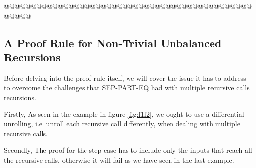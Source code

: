 @@@@@@@@@@@@@@@@@@@@@@@@@@@@@@@@@@@@@@@@@@@@@@@@@@@

\subsection{A Proof Rule for Non-Trivial Unbalanced Recursions}
\label{sec:adaptstep}
Before delving into the proof rule itself, we will cover the issue it has to address to overcome the challenges that SEP-PART-EQ had with multiple recursive calls recursions.

Firstly, As seen in the example in figure \ref{fig:f1f2}, we ought to use a differential unrolling, i.e. unroll each recursive call differently, when dealing with multiple recursive calls.

Secondly, The proof for the step case has to include only the inputs that reach all the recursive calls, otherwise it will fail as we have seen in the last example.

\iffalse
The solution that comes to mind is improving the assertion to limit $UFs\_count$ with the total number of $UF$ calls on both sides. We will define MRC-STEP-EQUIV$(f_1,f_2)$, a new proof rule for proving step case equivalence of programs with multiple recursive calls which implement our new $UFs\_count$ boundary. The Verification task for MRC-STEP-EQUIV$(f_1,f_2)$ is represented in figure \ref{fig:rvtmrcstepcase}. $\bar{f_1}$,$\bar{f_2}$ are $f_1$ and $f_2$ after being unrolled with a sync-unrolling.
\begin{figure} [h]
\begin{center}
\begin{minipage}{7 cm}
\begin{lstlisting}[escapeinside={(*}{*)}]
i = non_det()
res1 = (*$\bar{f_1}$*)(i)
res2 = (*$\bar{f_2}$*)(i)
assert(UFs_count < total_ufs_count((*$\bar{f_1}$*),(*$\bar{f_2}$*)) || res1==res2)
\end{lstlisting}
\end{minipage}
\caption{Proving step case equivalence for programs not limited to a single recursive call.}
\label{fig:rvtmrcstepcase}
\end{center}
\end{figure}
Note that the simple unrolling factors used in figure \ref{fig:rvtstepcase} have been replaced with differential unrollings for functions containing multiple recursive calls.
According to the call graph in \ref{fig:f1f2cgunrolled}, there are 6 $UF$s on both programs and that is the number that is the value of total\_ufs\_count($\bar{f_1}$,$\bar{f_2}$). Sending the new program with the fixed assertion to CBMC will prove the step case equivalent.
\fi

